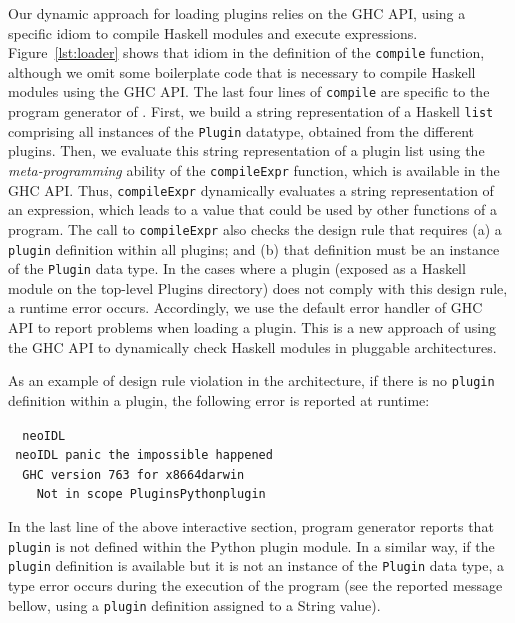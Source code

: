 Our dynamic approach for loading plugins relies on the 
 GHC API, using a specific idiom to compile Haskell
 modules and execute expressions. Figure~\ref{lst:loader} shows that
 idiom in the definition of the \texttt{compile} function, although we omit some boilerplate code that is 
 necessary to compile Haskell modules using the GHC API. The last four lines of \texttt{compile} are specific to the program generator of \neoidl.
First, we build a string representation of a Haskell \texttt{list} comprising 
 all instances of the \texttt{Plugin} datatype, obtained from the
 different \neoidl{} plugins. Then, we evaluate this string
 representation of a plugin list using the \emph{meta-programming} ability
 of the \texttt{compileExpr} function, which is available in the GHC
 API. Thus, \texttt{compileExpr} dynamically evaluates a string representation of an
 expression, which leads to a value that could be used by other
 functions of a program. 
The call to \texttt{compileExpr}  
also checks the design rule that requires 
(a) a \texttt{plugin} definition
within all \neoidl{} plugins; and (b) that  
definition must be an instance of the \texttt{Plugin} data type. 
In the cases where a plugin (exposed as a Haskell module on the
top-level Plugins directory) does not comply with this design rule, 
a runtime error occurs. Accordingly, we use the default error 
handler of GHC API to report problems when loading a plugin. 
This is a new approach of using the GHC
API to dynamically check Haskell modules in pluggable architectures. 


As an example of design rule violation in the \neoidl{} architecture, 
if there is no \texttt{plugin} definition within a
plugin, the following error is reported at runtime:

\begin{tabbing}\tt
~neoIDL\\
\tt ~neoIDL~panic~the~impossible~happened\\
\tt ~~GHC~version~763~for~x8664darwin\\
\tt ~~~~Not~in~scope~PluginsPythonplugin
\end{tabbing}

In the last line of the above interactive section, 
\neoidl{} program generator reports that \texttt{plugin} is not defined within 
the Python plugin module. In a similar way, if the \texttt{plugin}
definition is available but it is not an instance of the \texttt{Plugin}
data type, a type error occurs during the execution of the \neoidl{}
program (see the reported message bellow, using a \texttt{plugin} definition
assigned to a String value). 


